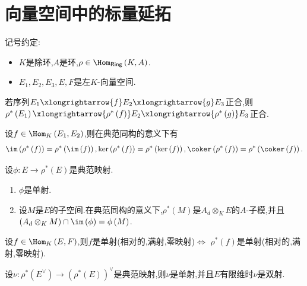 \section{向量空间中的标量延拓}

记号约定:

\begin{itemize}
	\item $K$是除环,$A$是环,$\rho\in\Hom_{\mathsf{Ring}}\left(K,A\right)$.
	\item $E_{1},E_{2},E_{3},E,F$是左$K$-向量空间.
\end{itemize}

\begin{proposition}{}{}
	若序列$E_{1}\xlongrightarrow{f}E_{2}\xlongrightarrow{g}E_{3}$正合,则$\rho^{\ast}\left(E_{1}\right)\xlongrightarrow{\rho^{\ast}\left(f\right)}E_{2}\xlongrightarrow{\rho^{\ast}\left(g\right)}E_{3}$正合.
\end{proposition}

\begin{corollary}{}{}
	设$f\in\Hom_{K}\left(E_{1},E_{2}\right)$,则在典范同构的意义下有
	\begin{align*}
		\im\left(\rho^{\ast}\left(f\right)\right)=\rho^{\ast}\left(\im\left(f\right)\right),\ker\left(\rho^{\ast}\left(f\right)\right)=\rho^{\ast}\left(\ker\left(f\right)\right),\coker\left(\rho^{\ast}\left(f\right)\right)=\rho^{\ast}\left(\coker\left(f\right)\right).
	\end{align*}
\end{corollary}

\begin{proposition}{}{}
	设$\phi:E\to\rho^{\ast}\left(E\right)$是典范映射.
	\begin{enumerate}
		\item $\phi$是单射.
		\item 设$M$是$E$的子空间.在典范同构的意义下,$\rho^{\ast}\left(M\right)$是$A_{d}\otimes_{K}E$的$A$-子模,并且$\left(A_{d}\otimes_{K}M\right)\cap\im\left(\phi\right)=\phi\left(M\right)$.
	\end{enumerate}
\end{proposition}

\begin{corollary}{}{}
	设$f\in\Hom_{K}\left(E,F\right)$,则$f$是单射(相对的,满射,零映射)$\iff$ $\rho^{\ast}\left(f\right)$是单射(相对的,满射,零映射).
\end{corollary}

\begin{proposition}{}{}
	设$\nu:\rho^{\ast}\left(E^{\vee}\right)\to\left(\rho^{\ast}\left(E\right)\right)^{\vee}$是典范映射,则$\nu$是单射,并且$E$有限维时$\nu$是双射.
\end{proposition}

